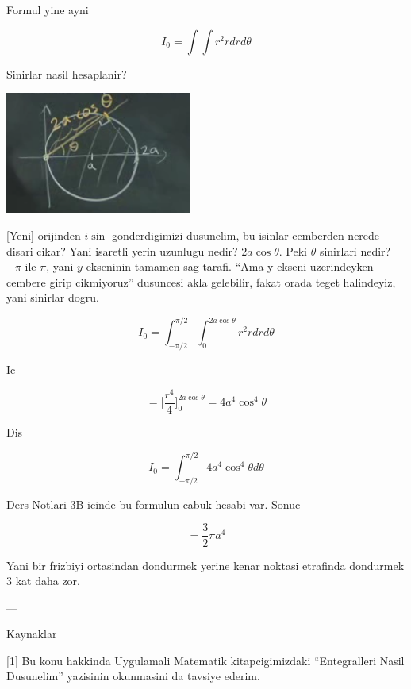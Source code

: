 \documentclass[12pt,fleqn]{article}\usepackage{../common}
\begin{document}
Formul yine ayni

\[ I_0 = \int \int r^2 r dr d\theta \]

Sinirlar nasil hesaplanir? 

\includegraphics[height=4cm]{17_10.png}

[Yeni] orijinden $i\sin$ gonderdigimizi dusunelim, bu isinlar cemberden nerede
disari cikar? Yani isaretli yerin uzunlugu nedir? $2a \cos\theta$. Peki
$\theta$ sinirlari nedir? $-\pi$ ile $\pi$, yani $y$ ekseninin tamamen sag
tarafi. ``Ama y ekseni uzerindeyken cembere girip cikmiyoruz'' dusuncesi
akla gelebilir, fakat orada teget halindeyiz, yani sinirlar dogru. 

\[ I_0 = \int_{-\pi/2}^{\pi/2} \int_0^{2a \cos\theta} r^2 r dr d\theta \]

Ic

\[ = \bigg[ \frac{r^4}{4} \bigg]_{0}^{2a \cos\theta} =
4a^4 \cos^4\theta
\]


Dis

\[ I_0 = \int_{-\pi/2}^{\pi/2} 4a^4 \cos^4\theta d\theta \]

Ders Notlari 3B icinde bu formulun cabuk hesabi var. Sonuc

\[  = \frac{3}{2} \pi a^4 \]

Yani bir frizbiyi ortasindan dondurmek yerine kenar noktasi etrafinda
dondurmek 3 kat daha zor. 






















---

Kaynaklar

[1] Bu konu hakkinda Uygulamali Matematik kitapcigimizdaki ``Entegralleri
Nasil Dusunelim'' yazisinin okunmasini da tavsiye ederim. 
\end{document}
